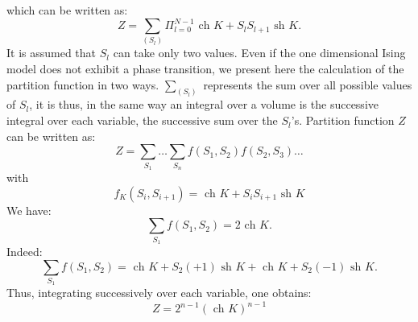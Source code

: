 \documentclass[12pt]{book}
\begin{document}
which can be written as:
\begin{equation}
Z=\sum_{(S_l)}\Pi_{l=0}^{N-1}\mbox{ ch } K +S_lS_{l+1}\mbox{ sh } K.
\end{equation}
It is assumed that $S_l$ can take only two values. Even if the one dimensional
Ising model does not exhibit a phase transition, we present here the
calculation of the partition function in two ways.
$\sum_{(S_l)}$ represents the sum over all possible values of $S_l$, it is
thus, in the same way an integral over a volume is the successive integral
over each variable, the successive sum over the $S_l$'s. Partition function $Z$
can be written as:
\begin{equation}
Z=\sum_{S_1}\dots\sum_{S_n}f(S_1,S_2)f(S_2,S_3)\dots
\end{equation}
with
\begin{equation}
f_{K}(S_i,S_{i+1})=\mbox{ ch } K +S_iS_{i+1}\mbox{ sh } K
\end{equation}
We have:
\begin{equation}
\sum_{S_1}f(S_1,S_2)=2 \mbox{ ch } K.
\end{equation}
Indeed:
\begin{equation}
\sum_{S_1}f(S_1,S_2)=\mbox{ ch } K +S_2 (+1)\mbox{ sh } K + \mbox{ ch } K +S_2 (-1) \mbox{ sh } K.
\end{equation}
Thus, integrating successively over each variable, one obtains:
\begin{equation}\label{eqZisi}
Z=2^{n-1} (\mbox{ ch } K)^{n-1}
\end{equation}
\end{document}
